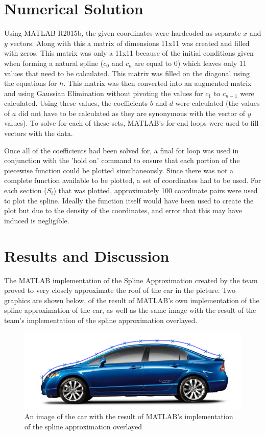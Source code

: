 \documentclass[12pt, letterpaper]{article} %
\begin{document}
\section{Numerical Solution}

Using MATLAB R2015b, the given coordinates were hardcoded as separate $x$ and $y$ vectors. Along with this a matrix of dimensions 11x11 was created and filled with zeros. This matrix was only a 11x11 because of the initial conditions given when forming a natural spline ($c_0$ and $c_n$ are equal to 0) which leaves only 11 values that need to be calculated. This matrix was filled on the diagonal using the equations for $h$. This matrix was then converted into an augmented matrix and using Gaussian Elimination without pivoting the values for $c_1$ to $c_{n-1}$ were calculated. Using these values, the coefficients $b$ and $d$ were calculated (the values of $a$ did not have to be calculated as they are synonymous with the vector of $y$ values). To solve for each of these sets, MATLAB's for-end loops were used to fill vectors with the data. 

Once all of the coefficients had been solved for, a final for loop was used in conjunction with the 'hold on' command to ensure that each portion of the piecewise function could be plotted simultaneously. Since there was not a complete function available to be plotted, a set of coordinates had to be used. For each section ($S_i$) that was plotted, approximately 100 coordinate pairs were used to plot the spline. Ideally the function itself would have been used to create the plot but due to the density of the coordinates, and error that this may have induced is negligible. 

\section{Results and Discussion}
The MATLAB implementation of the Spline Approximation created by the team proved to very closely approximate the roof of the car in the picture. Two graphics are shown below, of the result of MATLAB's own implementation of the spline approximation of the car, as well as the same image with the result of the team's implementation of the spline approximation overlayed.

\begin{center}
	\begin{figure}[H]
		\includegraphics[scale=0.5]{car_with_matlab_spline.png}
		\caption{An image of the car with the result of MATLAB's implementation of the spline approximation 			overlayed}
	\end{figure}
\end{center}
\end{document}
